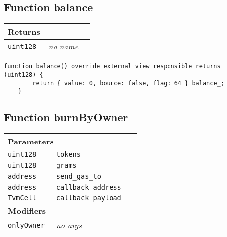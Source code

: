 \subsection{Function balance}


\ifsoltables
\noindent\begin{tabular}{|l|l|p{5cm}|}\hline
\multicolumn{3}{|l|}{\bf Returns}\\\hline
\tt uint128 & {\em no name} &\\\hline
\end{tabular}
\fi

\vspace{2cm}

\begin{lstlisting}[firstnumber=58]
    function balance() override external view responsible returns (uint128) {
        return { value: 0, bounce: false, flag: 64 } balance_;
    }
\end{lstlisting}

\subsection{Function burnByOwner}


\ifsoltables
\noindent\begin{tabular}{|l|l|p{5cm}|}\hline
\multicolumn{3}{|l|}{\bf Parameters}\\\hline
\tt uint128 & \tt tokens &\\\hline
\tt uint128 & \tt grams &\\\hline
\tt address & \tt send\_{}gas\_{}to &\\\hline
\tt address & \tt callback\_{}address &\\\hline
\tt TvmCell & \tt callback\_{}payload &\\\hline
\multicolumn{3}{|l|}{\bf Modifiers}\\\hline
\tt onlyOwner & {\em no args} &\\\hline
\end{tabular}
\fi

\vspace{2cm}

